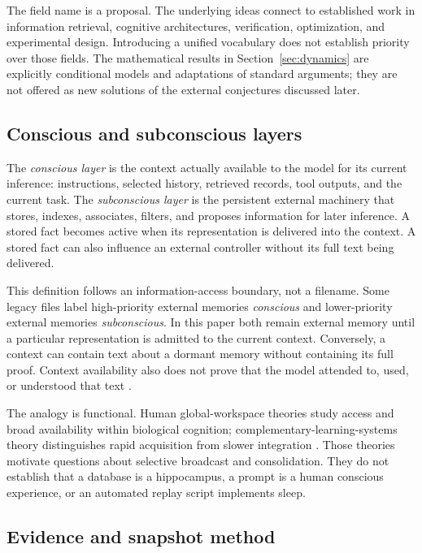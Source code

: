 The field name is a proposal. The underlying ideas connect to established work in information retrieval, cognitive architectures, verification, optimization, and experimental design. Introducing a unified vocabulary does not establish priority over those fields. The mathematical results in Section~\ref{sec:dynamics} are explicitly conditional models and adaptations of standard arguments; they are not offered as new solutions of the external conjectures discussed later.

\subsection{Conscious and subconscious layers}

The \emph{conscious layer} is the context actually available to the model for its current inference: instructions, selected history, retrieved records, tool outputs, and the current task. The \emph{subconscious layer} is the persistent external machinery that stores, indexes, associates, filters, and proposes information for later inference. A stored fact becomes active when its representation is delivered into the context. A stored fact can also influence an external controller without its full text being delivered.

This definition follows an information-access boundary, not a filename. Some legacy files label high-priority external memories \emph{conscious} and lower-priority external memories \emph{subconscious}. In this paper both remain external memory until a particular representation is admitted to the current context. Conversely, a context can contain text about a dormant memory without containing its full proof. Context availability also does not prove that the model attended to, used, or understood that text \citep{consciousness,canonical}.

The analogy is functional. Human global-workspace theories study access and broad availability within biological cognition; complementary-learning-systems theory distinguishes rapid acquisition from slower integration \citep{dehaene2011,mcclelland1995,shanahan2005}. Those theories motivate questions about selective broadcast and consolidation. They do not establish that a database is a hippocampus, a prompt is a human conscious experience, or an automated replay script implements sleep.

\subsection{Evidence and snapshot method}

